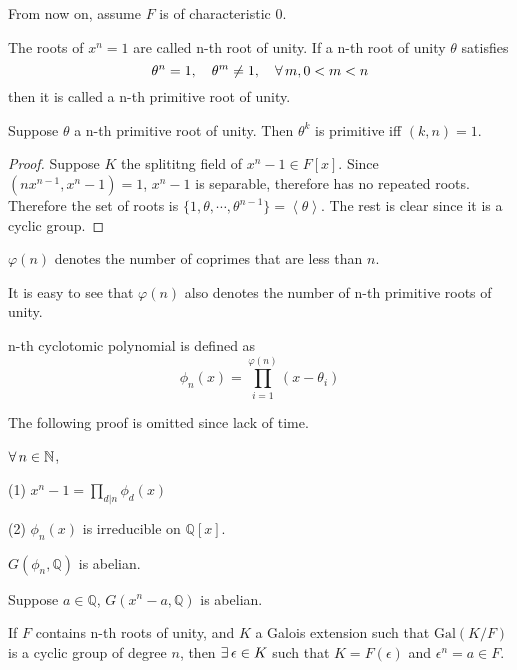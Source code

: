 \begin{remark}
    From now on, assume $F$ is of characteristic 0.
\end{remark}
\begin{definition}
    The roots of $x^n=1$ are called n-th root of unity. If a n-th root of unity $\theta$ satisfies
    $$
    \theta^n=1,\quad\theta^m\neq 1,\quad \forall\, m, 0<m<n
    $$
    then it is called a n-th primitive root of unity.
\end{definition}
\begin{proposition}
    Suppose $\theta$ a n-th primitive root of unity. Then $\theta^k$ is primitive iff $(k,n)=1$.
\end{proposition}
\begin{proof}
    Suppose $K$ the splititng field of $x^n-1\in F[x]$. Since $(nx^{n-1},x^n-1)=1$, $x^n-1$ is separable, therefore has no repeated roots. Therefore the set of roots is $\{1,\theta,\cdots,\theta^{n-1}\}=\left<\theta\right>$. The rest is clear since it is a cyclic group.
\end{proof}
\begin{definition}
    $\varphi(n)$ denotes the number of coprimes that are less than $n$.
\end{definition}
\begin{remark}
    It is easy to see that $\varphi(n)$ also denotes the number of n-th primitive roots of unity.
\end{remark}
\begin{definition}
    n-th cyclotomic polynomial is defined as
    $$
    \phi_n(x)=\prod^{\varphi(n)}_{i=1}(x-\theta_i)
    $$
\end{definition}
\begin{remark}
    The following proof is omitted since lack of time.
\end{remark}
\begin{proposition}
    $\forall\, n\in\mathbb{N}$,
    \par (1) $x^n-1=\prod_{d|n}\phi_d(x)$
    \par (2) $\phi_n(x)$ is irreducible on $\mathbb{Q}[x]$.
\end{proposition}
\begin{proposition}\label{tt1}
    $G(\phi_n,\mathbb{Q})$ is abelian.
\end{proposition}
\begin{proposition}\label{tt2}
    Suppose $a\in\mathbb{Q}$, $G(x^n-a,\mathbb{Q})$ is abelian.
\end{proposition}
\begin{proposition}\label{tt3}
    If $F$ contains n-th roots of unity, and $K$ a Galois extension such that $\mathrm{Gal}(K/F)$ is a cyclic group of degree $n$, then $\exists\,\epsilon\in K$ such that $K=F(\epsilon)$ and $\epsilon^n=a\in F$.
\end{proposition}